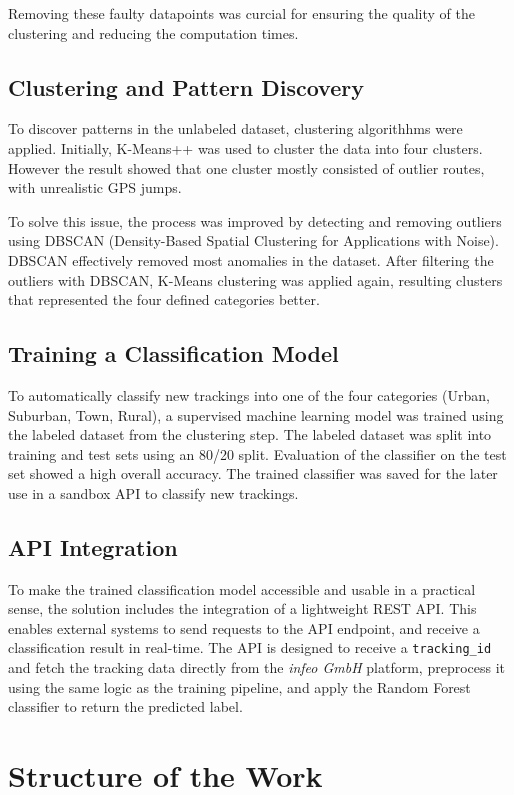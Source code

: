 \documentclass[a4paper,12pt,twoside]{scrreprt}
\begin{document}
Removing these faulty datapoints was curcial for ensuring the quality of the
clustering and reducing the computation times.

\subsection{Clustering and Pattern Discovery}
To discover patterns in the unlabeled dataset, clustering algorithhms were
applied.
Initially, K-Means++ was used to cluster the data into four clusters. However
the result showed that one cluster mostly consisted of outlier routes, with
unrealistic GPS jumps.

To solve this issue, the process was improved by detecting and removing
outliers using DBSCAN (Density-Based Spatial Clustering for Applications with
Noise). DBSCAN effectively removed most anomalies in the dataset. After
filtering the outliers with DBSCAN, K-Means clustering was applied again,
resulting clusters that represented the four defined categories better.

\subsection{Training a Classification Model}
To automatically classify new trackings into one of the four categories (Urban,
Suburban, Town, Rural), a supervised machine learning model was trained using
the labeled dataset from the clustering step.
The labeled dataset was split into training and test sets using an 80/20 split.
Evaluation of the classifier on the test set showed a high overall accuracy.
The trained classifier was saved for the later use in a sandbox API to classify
new trackings.

\subsection{API Integration}
To make the trained classification model accessible and usable in a practical
sense, the solution includes the integration of a lightweight REST API.
This enables external systems to send requests to the API endpoint, and
receive a classification result in real-time.
The API is designed to receive a \texttt{tracking\_id} and fetch the tracking
data directly from the \textit{infeo GmbH} platform, preprocess it using the
same logic as the training pipeline, and apply the Random Forest classifier to
return the predicted label.

\section{Structure of the Work}
\end{document}
